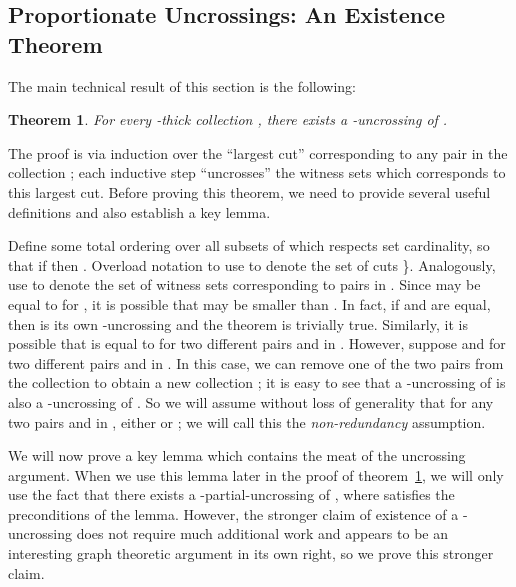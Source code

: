 \documentclass[11pt]{article}
\newtheorem{theorem}{Theorem}[section]
\begin{document}
\subsection{Proportionate Uncrossings: An Existence Theorem}
\label{sec:exists-proportionate}
The main technical result of this section is the following:
\begin{theorem}
\label{thm:uncross}
  For every -thick collection , there exists a
  -uncrossing of . 
\end{theorem}
The proof is via induction over the ``largest cut'' corresponding to any pair
in the collection ; each inductive step ``uncrosses'' the witness sets
which corresponds to this largest cut. Before proving this theorem, we need to
provide several useful definitions and also establish a key lemma.

Define some total ordering  over all subsets of  which respects set
cardinality, so that if  then . Overload
notation to use  to denote the set of cuts \}. Analogously, use  to denote the set of witness sets
corresponding to pairs in . Since  may be equal to 
for , it is possible that  may be smaller than
. In fact, if  and  are equal, then  is its
own -uncrossing and the theorem is trivially true. Similarly, it is
possible that  is equal to  for two different pairs 
and  in . However, suppose  and  for two different pairs  and  in . In this
case, we can remove one of the two pairs from the collection to obtain a new
collection ; it is easy to see that a -uncrossing of 
is also a -uncrossing of . So we will assume without loss of
generality that for any two pairs  and  in , either
 or ; we will call this the {\em
  non-redundancy} assumption.

We will now prove a key lemma which contains the meat of the uncrossing
argument. When we use this lemma later in the proof of
theorem~\ref{thm:uncross}, we will only use the fact that there exists a
-partial-uncrossing of , where  satisfies the
preconditions of the lemma. However, the stronger claim of existence of a
-uncrossing does not require much additional work and appears to be an
interesting graph theoretic argument in its own right, so we prove this
stronger claim.
\end{document}
